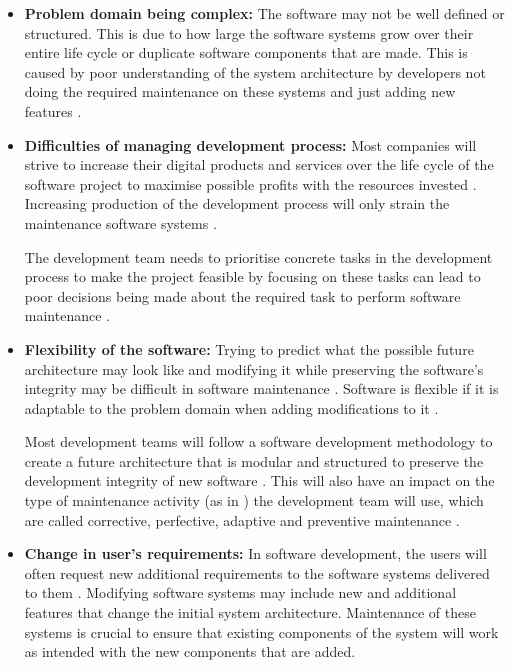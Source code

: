 \begin{itemize}
	\item \textbf{Problem domain being complex:} The software may not be well defined or structured. This is due to how large the software systems grow over their entire life cycle or duplicate software components that are made. This is caused by poor understanding of the system architecture by developers not doing the required maintenance on these systems and just adding new features \cite{Galster2019, Booch1986}.
	\item \textbf{Difficulties of managing development process:} Most companies will strive to increase their digital products and services over the life cycle of the software project to maximise possible profits with the resources invested \cite{Niu2018}. Increasing production of the development process will only strain the maintenance software systems \cite{Sneed2004}.\par The development team needs to prioritise concrete tasks in the development process to make the project feasible by focusing on these tasks can lead to poor decisions being made about the required task to perform software maintenance \cite{Galster2019, Ogheneovo2014, Lenarduzzi2017}. 
	\item \textbf{Flexibility of the software:} Trying to predict what the possible future architecture may look like and modifying it while preserving the software's integrity may be difficult in software maintenance \cite{Garlan1999}. Software is flexible if it is adaptable to the problem domain when adding modifications to it \cite{Ogheneovo2014}.\par Most development teams will follow a software development methodology to create a future architecture that is modular and structured to preserve the development integrity of new software \cite{Vijayasarathy2016, Rehman2018}. This will also have an impact on the type of maintenance activity (as in ) the development team will use, which are called corrective, perfective, adaptive and preventive maintenance \cite{Thamburaj2017, Hasan2012, Stojanov2017, Snipes2018}.
	\item \textbf{Change in user's requirements:} In software development, the users will often request new additional requirements to the software systems delivered to them \cite{Ogheneovo2014}. Modifying software systems may include new and additional features that change the initial system architecture. Maintenance of these systems is crucial to ensure that existing components of the system will work as intended with the new components that are added.
\end{itemize}

